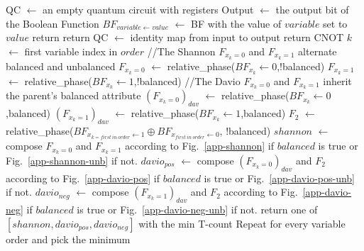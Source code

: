 \begin{algorithm}[t]
  \caption{relative\_phase(BF: a Boolean function, balanced: Boolean indicating whether this function is balanced)}
  \label{algo-new}
  \begin{algorithmic}
    \State QC $\leftarrow$ an empty quantum circuit with registers
    \State Output $\leftarrow$ the output bit of the Boolean Function
    \State {}
    \State $BF_{{variable}\leftarrow value}$ $\leftarrow$ BF with the value of $variable$ set to $value$
    \State return 
    \State return QC $\leftarrow$ identity map from input to output
    \State return CNOT
    \Else
    \State    $k$ $\leftarrow$ first variable index in $order$
    \State    //The Shannon $F_{x_k=0}$ and $F_{x_k=1}$ alternate balanced and unbalanced
    \State    $F_{x_k=0}$ $\leftarrow$ relative\_phase($BF_{x_k}\leftarrow 0$,!balanced) 
    \State    $F_{x_k=1}$ $\leftarrow$ relative\_phase($BF_{x_k}\leftarrow 1$,!balanced) 
    \State
    \State    //The Davio $F_{x_k=0}$ and $F_{x_k=1}$ inherit the parent's balanced attribute
    \State    $(F_{x_k=0})_{dav}$ $\leftarrow$ relative\_phase($BF_{x_k}\leftarrow 0$,balanced) 
    \State    $(F_{x_k=1})_{dav}$ $\leftarrow$ relative\_phase($BF_{x_k}\leftarrow 1$,balanced) 
    \State
    \State    $F_2$ $\leftarrow$ relative\_phase($BF_{x_{k = first\ in\ order}\leftarrow 1} \oplus BF_{x_{first\ in\ order}\leftarrow 0}$,
    \State                       !balanced)
    \State
    \State    $shannon$ $\leftarrow$ compose $F_{x_k=0}$ and $F_{x_k=1}$ according to Fig.~\ref{app-shannon}  if $balanced$ is true or Fig.~\ref{app-shannon-unb} if not.
    \State    $davio_{pos}$ $\leftarrow$ compose $(F_{x_k=0})_{dav}$ and $F_2$ according to Fig.~\ref{app-davio-pos} if $balanced$ is true or Fig.~\ref{app-davio-pos-unb} if not.
    \State    $davio_{neg}$ $\leftarrow$ compose $(F_{x_k=1})_{dav}$ and $F_2$ according to Fig.~\ref{app-davio-neg} if $balanced$ is true or Fig.~\ref{app-davio-neg-unb} if not.
    \State    return one of $[shannon, davio_{pos},davio_{neg}]$ with the min T-count
    \EndIf
    \State Repeat for every variable order and pick the minimum
  \end{algorithmic}
  
\end{algorithm}


